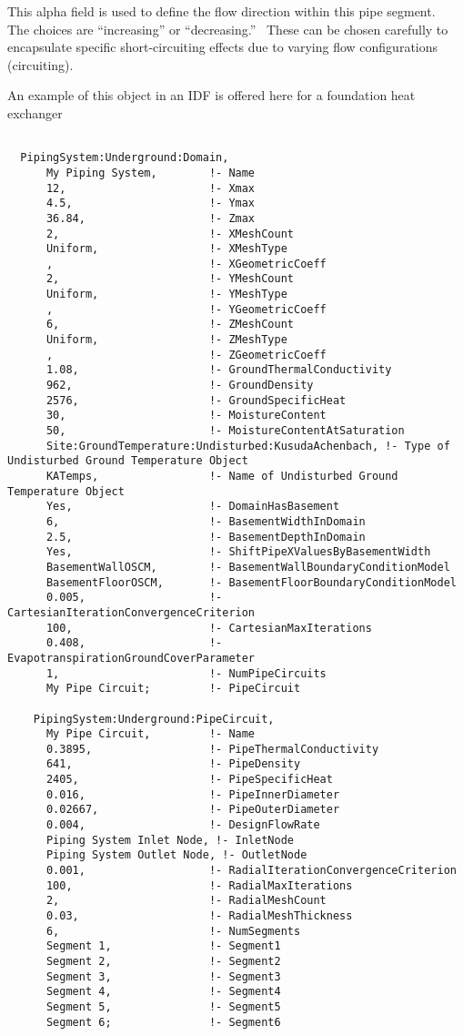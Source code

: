 This alpha field is used to define the flow direction within this pipe segment.~ The choices are ``increasing'' or ``decreasing.''~ These can be chosen carefully to encapsulate specific short-circuiting effects due to varying flow configurations (circuiting).

An example of this object in an IDF is offered here for a foundation heat exchanger

\begin{lstlisting}

  PipingSystem:Underground:Domain,
      My Piping System,        !- Name
      12,                      !- Xmax
      4.5,                     !- Ymax
      36.84,                   !- Zmax
      2,                       !- XMeshCount
      Uniform,                 !- XMeshType
      ,                        !- XGeometricCoeff
      2,                       !- YMeshCount
      Uniform,                 !- YMeshType
      ,                        !- YGeometricCoeff
      6,                       !- ZMeshCount
      Uniform,                 !- ZMeshType
      ,                        !- ZGeometricCoeff
      1.08,                    !- GroundThermalConductivity
      962,                     !- GroundDensity
      2576,                    !- GroundSpecificHeat
      30,                      !- MoistureContent
      50,                      !- MoistureContentAtSaturation
      Site:GroundTemperature:Undisturbed:KusudaAchenbach, !- Type of Undisturbed Ground Temperature Object
      KATemps,                 !- Name of Undisturbed Ground Temperature Object
      Yes,                     !- DomainHasBasement
      6,                       !- BasementWidthInDomain
      2.5,                     !- BasementDepthInDomain
      Yes,                     !- ShiftPipeXValuesByBasementWidth
      BasementWallOSCM,        !- BasementWallBoundaryConditionModel
      BasementFloorOSCM,       !- BasementFloorBoundaryConditionModel
      0.005,                   !- CartesianIterationConvergenceCriterion
      100,                     !- CartesianMaxIterations
      0.408,                   !- EvapotranspirationGroundCoverParameter
      1,                       !- NumPipeCircuits
      My Pipe Circuit;         !- PipeCircuit

    PipingSystem:Underground:PipeCircuit,
      My Pipe Circuit,         !- Name
      0.3895,                  !- PipeThermalConductivity
      641,                     !- PipeDensity
      2405,                    !- PipeSpecificHeat
      0.016,                   !- PipeInnerDiameter
      0.02667,                 !- PipeOuterDiameter
      0.004,                   !- DesignFlowRate
      Piping System Inlet Node, !- InletNode
      Piping System Outlet Node, !- OutletNode
      0.001,                   !- RadialIterationConvergenceCriterion
      100,                     !- RadialMaxIterations
      2,                       !- RadialMeshCount
      0.03,                    !- RadialMeshThickness
      6,                       !- NumSegments
      Segment 1,               !- Segment1
      Segment 2,               !- Segment2
      Segment 3,               !- Segment3
      Segment 4,               !- Segment4
      Segment 5,               !- Segment5
      Segment 6;               !- Segment6


\end{lstlisting}
